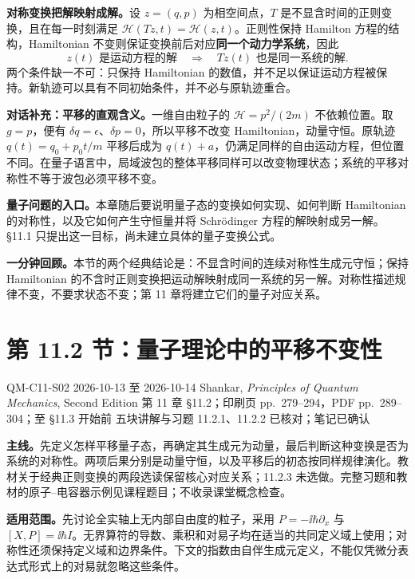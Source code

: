 \textbf{对称变换把解映射成解。}设 $z=(q,p)$ 为相空间点，$T$ 是不显含时间的正则变换，且在每一时刻满足 $\mathcal H(Tz,t)=\mathcal H(z,t)$。正则性保持 Hamilton 方程的结构，Hamiltonian 不变则保证变换前后对应\textbf{同一个动力学系统}，因此
\begin{equation}
  \boxed{z(t)\text{ 是运动方程的解}
    \quad\Longrightarrow\quad Tz(t)\text{ 也是同一系统的解}}.
\end{equation}
两个条件缺一不可：只保持 Hamiltonian 的数值，并不足以保证运动方程被保持。新轨迹可以具有不同初始条件，并不必与原轨迹重合。

\textbf{对话补充：平移的直观含义。}一维自由粒子的 $\mathcal H=p^2/(2m)$ 不依赖位置。取 $g=p$，便有 $\delta q=\epsilon$、$\delta p=0$，所以平移不改变 Hamiltonian，动量守恒。原轨迹 $q(t)=q_0+p_0t/m$ 平移后成为 $q(t)+a$，仍满足同样的自由运动方程，但位置不同。在量子语言中，局域波包的整体平移同样可以改变物理状态；系统的平移对称性不等于波包必须平移不变。

\textbf{量子问题的入口。}本章随后要说明量子态的变换如何实现、如何判断 Hamiltonian 的对称性，以及它如何产生守恒量并将 Schr\"odinger 方程的解映射成另一解。\S 11.1 只提出这一目标，尚未建立具体的量子变换公式。

\textbf{一分钟回顾。}本节的两个经典结论是：不显含时间的连续对称性生成元守恒；保持 Hamiltonian 的不含时正则变换把运动解映射成同一系统的另一解。对称性描述规律不变，不要求状态不变；第 11 章将建立它们的量子对应关系。

\section{第 11.2 节：量子理论中的平移不变性}
\label{section:QM-C11-S02}
\studymeta
  {QM-C11-S02}
  {2026-10-13 至 2026-10-14}
  {Shankar, \textit{Principles of Quantum Mechanics}, Second Edition}
  {第 11 章 \S 11.2；印刷页 pp.~279--294，PDF pp.~289--304；至 \S 11.3 开始前}
  {五块讲解与习题 11.2.1、11.2.2 已核对；笔记已确认}

\textbf{主线。}先定义怎样平移量子态，再确定其生成元为动量，最后判断这种变换是否为系统的对称性。两项后果分别是动量守恒，以及平移后的初态按同样规律演化。教材关于经典正则变换的两段选读保留核心对应关系；11.2.3 未选做。完整习题和教材的原子--电容器示例见课程题目；不收录课堂概念检查。

\textbf{适用范围。}先讨论全实轴上无内部自由度的粒子，采用 $P=-\ii\hbar\partial_x$ 与 $[X,P]=\ii\hbar I$。无界算符的导数、乘积和对易子均在适当的共同定义域上使用；对称性还须保持定义域和边界条件。下文的指数由自伴生成元定义，不能仅凭微分表达式形式上的对易就忽略这些条件。

